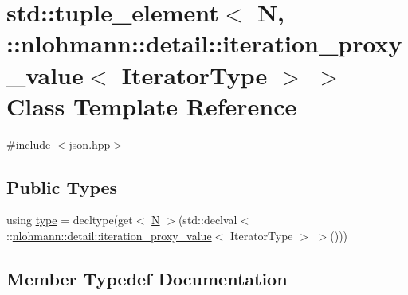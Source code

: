 \hypertarget{classstd_1_1tuple__element_3_01_n_00_01_1_1nlohmann_1_1detail_1_1iteration__proxy__value_3_01_iterator_type_01_4_01_4}{}\section{std\+::tuple\+\_\+element$<$ N, \+::nlohmann\+::detail\+::iteration\+\_\+proxy\+\_\+value$<$ Iterator\+Type $>$ $>$ Class Template Reference}
\label{classstd_1_1tuple__element_3_01_n_00_01_1_1nlohmann_1_1detail_1_1iteration__proxy__value_3_01_iterator_type_01_4_01_4}


{\ttfamily \#include $<$json.\+hpp$>$}

\subsection*{Public Types}
\begin{DoxyCompactItemize}
\item 
using \mbox{\hyperlink{classstd_1_1tuple__element_3_01_n_00_01_1_1nlohmann_1_1detail_1_1iteration__proxy__value_3_01_iterator_type_01_4_01_4_ace1dfdb74841c2f58c064a50598188fd}{type}} = decltype(get$<$ \mbox{\hyperlink{_keyboard_event_8h_a8cc2e7240164328fdc3f0e5e21032c56}{N}} $>$(std\+::declval$<$ \+::\mbox{\hyperlink{classnlohmann_1_1detail_1_1iteration__proxy__value}{nlohmann\+::detail\+::iteration\+\_\+proxy\+\_\+value}}$<$ Iterator\+Type $>$ $>$()))
\end{DoxyCompactItemize}


\subsection{Member Typedef Documentation}
\mbox{\label{classstd_1_1tuple__element_3_01_n_00_01_1_1nlohmann_1_1detail_1_1iteration__proxy__value_3_01_iterator_type_01_4_01_4_ace1dfdb74841c2f58c064a50598188fd}} 
